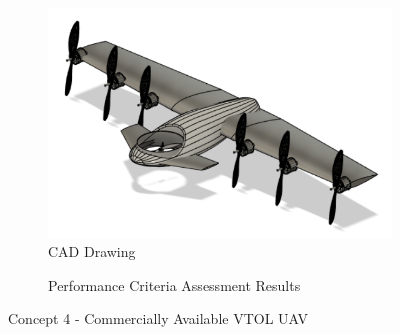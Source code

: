 \begin{figure}[H]
\centering
\begin{subfigure}[t]{.5\textwidth}
  \centering
  \includegraphics[width=0.95\linewidth]{Concepts/CAD/8cad.png}
  \caption{CAD Drawing}
  \label{fig:cad1}
\end{subfigure}%
\begin{subfigure}[t]{.5\textwidth}
  \centering
  \caption{Performance Criteria Assessment Results}
  \label{fig:radar1}
\end{subfigure}
\caption{Concept 4 - Commercially Available VTOL UAV}
\label{fig:concept2}
\end{figure}

